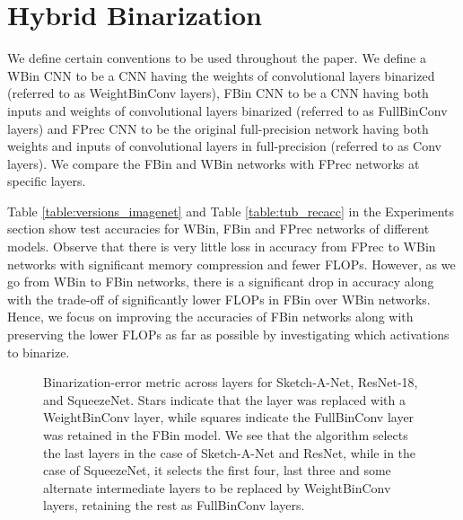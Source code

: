 \documentclass[10pt,twocolumn,letterpaper]{article}
\begin{document}
\section{Hybrid Binarization}

We define certain conventions to be used throughout the paper. We define a WBin CNN to be a CNN having the weights of convolutional layers binarized (referred to as WeightBinConv layers), FBin CNN to be a CNN having both inputs and weights of convolutional layers binarized (referred to as FullBinConv layers) and FPrec CNN to be the original full-precision network having both weights and inputs of convolutional layers in full-precision (referred to as Conv layers). We compare the FBin and WBin networks with FPrec networks at specific layers.


Table \ref{table:versions_imagenet} and Table \ref{table:tub_recacc} in the Experiments section show test accuracies for WBin, FBin and FPrec networks of different models. Observe that there is very little loss in accuracy from FPrec to WBin networks with significant memory compression and fewer FLOPs. However, as we go from WBin to FBin networks, there is a significant drop in accuracy along with the trade-off of significantly lower FLOPs in FBin over WBin networks. %
Hence, we focus on improving the accuracies of FBin networks along with preserving the lower FLOPs as far as possible by investigating which activations to binarize.


\begin{figure*}[t]
\vspace*{-0.50cm}
\vspace*{-0.5cm}
\caption{Binarization-error metric across layers for Sketch-A-Net, ResNet-18, and SqueezeNet. Stars indicate that the layer was replaced with a WeightBinConv layer, while squares indicate the FullBinConv layer was retained in the FBin model. We see that the algorithm selects the last layers in the case of Sketch-A-Net and ResNet, while in the case of SqueezeNet, it selects the first four, last three and some alternate intermediate layers to be replaced by WeightBinConv layers, retaining the rest  as FullBinConv layers.}
\label{fig:metric}
\vspace*{-0.4cm}
\end{figure*}
\end{document}

